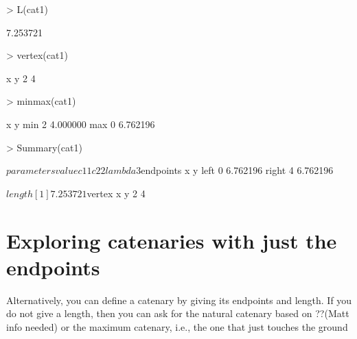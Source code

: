 \documentclass{article}
\begin{document}
\begin{Schunk}
\begin{Sinput}
> L(cat1)
\end{Sinput}
\begin{Soutput}
[1] 7.253721
\end{Soutput}
\begin{Sinput}
> vertex(cat1)
\end{Sinput}
\begin{Soutput}
x y 
2 4 
\end{Soutput}
\begin{Sinput}
> minmax(cat1)
\end{Sinput}
\begin{Soutput}
    x        y
min 2 4.000000
max 0 6.762196
\end{Soutput}
\begin{Sinput}
> Summary(cat1)
\end{Sinput}
\begin{Soutput}
$parameters
       value
c1         1
c2         2
lambda     3

$endpoints
      x        y
left  0 6.762196
right 4 6.762196

$length
[1] 7.253721

$vertex
x y 
2 4 
\end{Soutput}
\end{Schunk}

\section{ Exploring catenaries with just the endpoints}
Alternatively, you can define a catenary by giving its endpoints and length. If you do not give a length, then you can ask for the natural catenary based on ??(Matt info needed) or the maximum catenary, i.e., the one that just touches the ground
\end{document}
